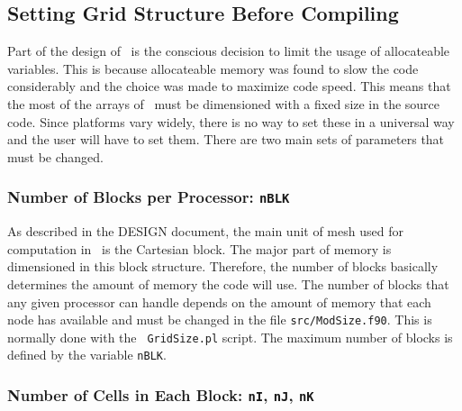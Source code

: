 \subsection{Setting Grid Structure Before Compiling \BATSRUS\ \label{section:before_compile}}

Part of the design of \BATSRUS\ is the conscious decision to limit the
usage of allocateable variables.  This is because
allocateable memory was found to slow the code considerably and 
the choice was made to maximize code speed.  This means that the
most of the arrays of \BATSRUS\ must be dimensioned with a fixed size
in the source code. 
Since platforms vary widely, there is no way to set these in a universal
way and the user will have to set them.  There are two main sets of 
parameters that must be changed.

\subsubsection{Number of Blocks per Processor: {\tt nBLK} \label{section:nblk}}

As described in the DESIGN document, the main unit of mesh used for
computation in \BATSRUS\ is the Cartesian block.  The major part of
memory is dimensioned in this block structure.  Therefore, the number
of blocks basically determines the amount of memory the code will use.
The number of blocks that any given processor can handle depends on
the amount of memory that each node has available and must be changed
in the file {\tt src/ModSize.f90}. This is normally done with the {\tt
GridSize.pl} script.  The maximum number of blocks is defined by the
variable {\tt nBLK}.

\subsubsection{Number of Cells in Each Block: {\tt nI},
{\tt nJ}, {\tt nK} \label{section:ncells}}

